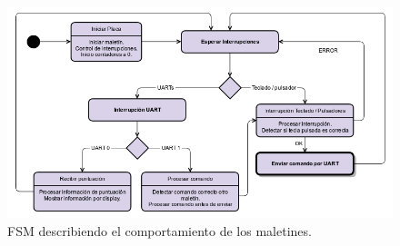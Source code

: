 \begin{figure}[h]
  \centering
  \includegraphics[width=1.0\textwidth]{images/maletin_fsm.png}
  \caption{FSM describiendo el comportamiento de los maletines.}
  \label{s3:fig:FSM_maletin}
\end{figure}





%
%


